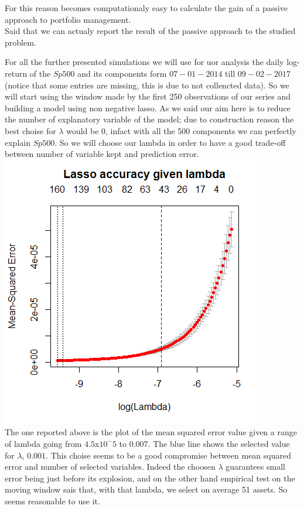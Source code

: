 \documentclass{article}%
\begin{document}
For this reason becomes computationaly easy to calculate the gain of a passive approach to portfolio management. 
\\

Said that we can actualy report the result of the passive approach to the studied problem.

For all the further presented simulations we will use for uor analysis the daily log-return of the $Sp500$ and its components form $07-01-2014$ till $09-02-2017$ (notice that some entries are missing, this is due to not collencted data). So we will start using the window made by the first 250 observations of our series and building a model using non negative lasso. As we said our aim here is to reduce the number of explanatory variable of the model; due to construction reason the best choise for $\lambda$ would be 0, infact with all the 500 components we can perfectly explain $Sp500$. So we will choose our lambda in order to have a good trade-off between number of variable kept and prediction error. 
\\


\includegraphics[scale=0.75]{lassoplot}
\\

The one reported above is the plot of the mean squared error value given a range of lambda going from $4.5$x$10^-5$ to $0.007$. The blue line shows the selected value for $\lambda$, $0.001$. This choise seems to be a good compromise between mean squared error and number of selected variables. Indeed the choosen $\lambda$	guarantees small error being just before its explosion, and on the other hand empirical test on the moving window sais that, with that lambda, we select on average 51 assets. So seems reasonable to use it.
\end{document}
